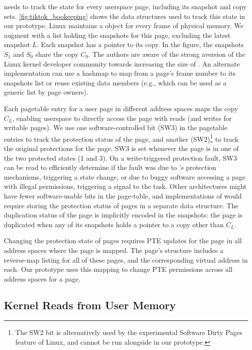\documentclass[letterpaper,twocolumn,10pt, anonymous]{article}
\begin{document}
\tiktok needs to track the state for every userspace page, including
its snapshot and copy sets.
\autoref{fig:tiktok_bookeeping} shows the data structures used to
track this state in our prototype.
Linux maintains a  object for every frame of 
physical memory. 
We augment   with a list holding the snapshots
for this page, excluding the latest snapshot $L$.
Each snapshot has a pointer to its copy. 
In the figure, the snapshots $S_1$ and $S_0$ share the copy $C_0$.
The authors are aware of the strong aversion of the 
Linux kernel developer community towards increasing the size of 
. 
An alternate implementation can use a hashmap to
map from a page's frame number to its snapshots list or
reuse existing data members (e.g.,  which 
can be used as a generic list by page owners).

Each pagetable entry for a user page in different address spaces 
maps the copy $C_L$, enabling userspace to directly access the page
with reads (and writes for writable pages).
We use one software-controlled bit (SW3) in the pagetable entries 
to track the protection status of the page, and another 
(SW2)\footnote{The SW2 bit is alternatively used by the experimental Software Dirty Pages feature of 
Linux, and cannot be run alongside \tiktok in our prototype.}
to track the original protections for the page. 
SW3 is set whenever the page is in one of the two protected
states (1 and 3).
On a write-triggered protection fault, SW3 can be read to 
efficiently determine if the fault was due to \tiktok's protection 
mechanisms, triggering a state change, or due to buggy software
accessing a page with illegal permissions, triggering a signal to 
the task.
Other architectures might have fewer software-usable 
bits in the page-table, and implementations of \tiktok would 
require storing the protection status of pages in a separate data structure.
The duplication status of the page is implicitly encoded in the 
snapshots: the page is duplicated when any of its snapshots
holds a pointer to a copy other than $C_L$.

Changing the protection state of pages requires PTE updates
for the page in all address spaces where the page is mapped.
The page's  structure includes a reverse-map
listing for all of these pages, and the corresponding virtual
address in each.
Our prototype uses this mapping to change PTE permissions across
all address spaces for a page.


\subsection{Kernel Reads from User Memory}
\end{document}
